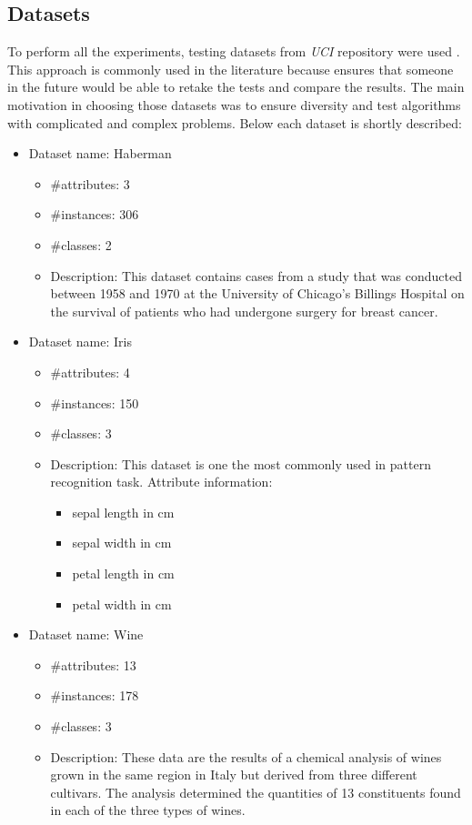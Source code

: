 \subsection{Datasets}
\label{cha:Datasets}
To perform all the experiments, testing datasets from \textit{UCI} repository were used \cite{bib47}.
This approach is commonly used in the literature because ensures that someone
in the future would be able to retake the tests and compare the results. 
The main motivation in choosing those datasets was to ensure diversity and test
algorithms with complicated and complex problems. Below each dataset is shortly
described:
\begin{itemize}
    \item Dataset name: Haberman
        \begin{itemize} 
            \item \#attributes: 3
            \item \#instances: 306
            \item \#classes: 2
            \item Description:
                This dataset contains cases from a study that was conducted
                between 1958 and 1970 at the University of Chicago's Billings Hospital 
                on the survival of patients who had undergone surgery for breast cancer.
        \end{itemize}
    \item Dataset name: Iris
        \begin{itemize}
            \item \#attributes: 4
            \item \#instances: 150
            \item \#classes: 3
            \item Description:
                This dataset is one the most commonly used in
                pattern recognition task. Attribute information:
                \begin{itemize}
                    \item sepal length in cm 
                    \item sepal width in cm 
                    \item petal length in cm 
                    \item petal width in cm 
                \end{itemize}
        \end{itemize} 
    \item Dataset name: Wine
        \begin{itemize}
            \item \#attributes: 13
            \item \#instances: 178
            \item \#classes: 3
            \item Description:
                These data are the results of a chemical analysis of wines
                grown in the same region in Italy but derived from three 
                different cultivars. The analysis determined the quantities 
                of 13 constituents found in each of the three types of wines. 
        \end{itemize}


\end{itemize}
